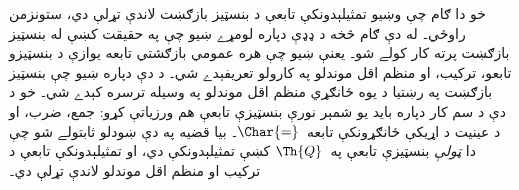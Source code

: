 \documentclass[../../../include/open-logic-section]{subfiles}
\begin{document}
خو دا ګام چې وښيو تمثيلېدونکې تابعې د بنسټيز بازګښت لاندې تړلې دي،
ستونزمن راوځي۔ له دې ګام څخه د ډډې دپاره لومړے ښيو چې په حقيقت کښې
له بنسټيز بازګښت پرته کار کولے شو۔ يعنې ښيو چې هره عمومي بازګشتي
تابعه يوازې د بنسټيزو تابعو، ترکيب، او منظم اقل موندلو په کارولو
تعريفېدے شي۔ د دې دپاره ښيو چې بنسټيز بازګښت په رښتيا د يوه ځانګړي
منظم اقل موندلو په وسيله ترسره کېدے شي۔ خو د دې د سم کار دپاره بايد
يو شمېر نورې بنسټيزې تابعې هم ورزياتې کړو: جمع، ضرب، او د عينيت د
اړيکې ځانګړونکې تابعه~$\Char{=}$۔ بيا قضيه په دې ښودلو ثابتولے شو
چې دا \emph{ټولې} بنسټيزې تابعې په~$\Th{Q}$ کښې تمثيلېدونکې دي، او
تمثيلېدونکې تابعې د ترکيب او منظم اقل موندلو لاندې تړلې دي۔
\end{document}
